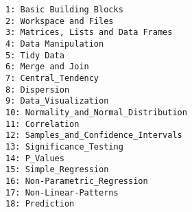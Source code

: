 \documentclass[12pt,article]{article}
\begin{document}
\large
\begin{verbatim}
1: Basic Building Blocks
2: Workspace and Files
3: Matrices, Lists and Data Frames
4: Data Manipulation
5: Tidy Data
6: Merge and Join
7: Central_Tendency
8: Dispersion
9: Data_Visualization
10: Normality_and_Normal_Distribution
11: Correlation
12: Samples_and_Confidence_Intervals
13: Significance_Testing
14: P_Values
15: Simple_Regression
16: Non-Parametric_Regression
17: Non-Linear-Patterns
18: Prediction
\end{verbatim}
\end{document}
